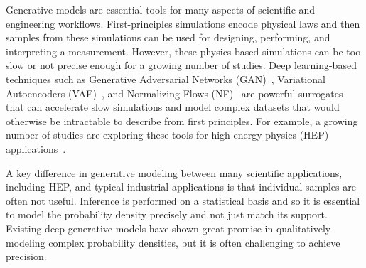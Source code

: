 Generative models are essential tools for many aspects of scientific and engineering workflows. First-principles simulations encode physical laws and then samples from these simulations can be used for designing, performing, and interpreting a measurement. However, these physics-based simulations can be too slow or not precise enough for a growing number of studies. Deep learning-based techniques such as Generative Adversarial Networks (GAN)~\cite{Goodfellow:2014:GAN:2969033.2969125,Creswell2018}, Variational Autoencoders (VAE)~\cite{kingma2014autoencoding,Kingma2019}, and Normalizing Flows (NF)~\cite{10.5555/3045118.3045281,Kobyzev2020} are powerful surrogates that can accelerate slow simulations and model complex datasets that would otherwise be intractable to describe from first principles. For example, a growing number of studies are exploring these tools for high energy physics (HEP) applications~\cite{deOliveira:2017pjk,Paganini:2017hrr,Paganini:2017dwg,Alonso-Monsalve:2018aqs,Butter:2019eyo,Martinez:2019jlu,Bellagente:2019uyp,Vallecorsa:2019ked,SHiP:2019gcl,Carrazza:2019cnt,Butter:2019cae,Lin:2019htn,DiSipio:2019imz,Hashemi:2019fkn,Chekalina:2018hxi,ATL-SOFT-PUB-2018-001,Zhou:2018ill,Carminati:2018khv,Vallecorsa:2018zco,Datta:2018mwd,Musella:2018rdi,Erdmann:2018kuh,Deja:2019vcv,Derkach:2019qfk,Erbin:2018csv,Erdmann:2018jxd,Urban:2018tqv,Oliveira:DLPS2017,deOliveira:2017rwa,Farrell:2019fsm,Hooberman:DLPS2017,Belayneh:2019vyx,buhmann2020getting,Alanazi:2020jod,2009.03796,2008.06545,Kansal:2020svm,Maevskiy:2020ank,Lai:2020byl,Choi:2021sku,Rehm:2021zow,Rehm:2021zoz,Carrazza:2021hny,Albergo:2019eim,Kanwar:2003.06413,Brehmer:2020vwc,Bothmann:2020ywa,Gao:2020zvv,Gao:2020vdv,Nachman:2020lpy,Choi:2020bnf,Lu:2020npg,Bieringer:2020tnw,Hollingsworth:2021sii,Monk:2018zsb,Cheng:2020dal,1816035,Howard:2021pos,Buhmann:2021lxj,Bortolato:2021zic,deja2020endtoend,Hariri:2021clz,Fanelli:2019qaq, 1800956, Bellagente:2021yyh}.

A key difference in generative modeling between many scientific applications, including HEP, and typical industrial applications is that individual samples are often not useful. Inference is performed on a statistical basis and so it is essential to model the probability density precisely and not just match its support. Existing deep generative models have shown great promise in qualitatively modeling complex probability densities, but it is often challenging to achieve precision.

